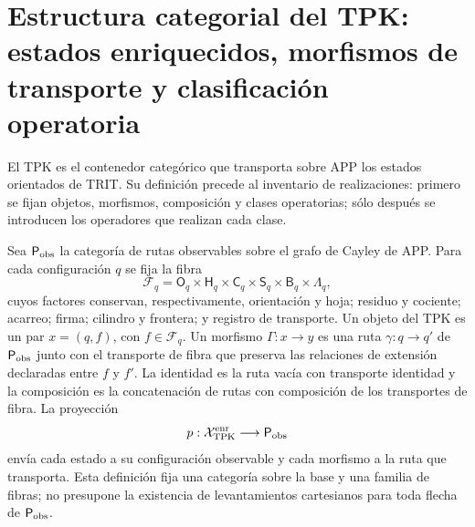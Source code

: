 \section{Estructura categorial del TPK: estados enriquecidos, morfismos de
transporte y clasificación operatoria}
\label{sec:arbol-operatorio-tpk-rev11}

El TPK es el contenedor categórico que transporta sobre APP los estados
orientados de TRIT. Su definición precede al inventario de realizaciones:
primero se fijan objetos, morfismos, composición y clases operatorias; sólo
después se introducen los operadores que realizan cada clase.

\begin{definition}
\label{def:estado-enriquecido-tpk-rev11}
Sea \(\mathsf P_{\rm obs}\) la categoría de rutas observables sobre el grafo
de Cayley de APP. Para cada configuración \(q\) se fija la fibra
\[
 \mathcal F_q=
 \mathsf O_q\times\mathsf H_q\times\mathsf C_q\times
 \mathsf S_q\times\mathsf B_q\times\mathsf\Lambda_q,
\]
cuyos factores conservan, respectivamente, orientación y hoja; residuo y
cociente; acarreo; firma; cilindro y frontera; y registro de transporte. Un
objeto del TPK es un par \(x=(q,f)\), con \(f\in\mathcal F_q\). Un morfismo
\(\Gamma:x\to y\) es una ruta \(\gamma:q\to q'\) de
\(\mathsf P_{\rm obs}\) junto con el transporte de fibra que preserva las
relaciones de extensión declaradas entre \(f\) y \(f'\). La identidad es la
ruta vacía con transporte identidad y la composición es la concatenación de
rutas con composición de los transportes de fibra. La proyección
\[
 p:\mathcal X_{\rm TPK}^{\rm enr}\longrightarrow\mathsf P_{\rm obs}
\]
envía cada estado a su configuración observable y cada morfismo a la ruta que
transporta. Esta definición fija una categoría sobre la base y una familia de
fibras; no presupone la existencia de levantamientos cartesianos para toda
flecha de \(\mathsf P_{\rm obs}\).
\end{definition}

